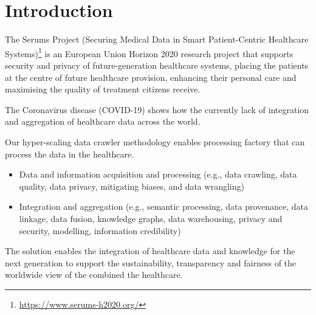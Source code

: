 \section{Introduction}


The Serums Project (Securing Medical Data in Smart Patient-Centric Healthcare Systems)\footnote{\url{https://www.serums-h2020.org/}} is an European Union Horizon 2020 research project that supports security and privacy of future-generation healthcare systems, placing the patients at the centre of future healthcare provision, enhancing their personal care and maximising the quality of treatment citizens receive. 

The Coronavirus disease (COVID-19) shows how the currently lack of integration and aggregation of healthcare data across the world.

Our hyper-scaling data crawler methodology enables processing factory that can process the data in the healthcare.

\begin{itemize}
    \item Data and information acquisition and processing (e.g., data crawling, data quality, data privacy, mitigating biases, and data wrangling)
    \item Integration and aggregation (e.g., semantic processing, data provenance, data linkage, data fusion, knowledge graphs, data warehousing, privacy and security, modelling, information credibility)
\end{itemize}

The solution enables the integration of healthcare data and knowledge for the next generation to support the sustainability, transparency and fairness of the worldwide view of the combined the healthcare.